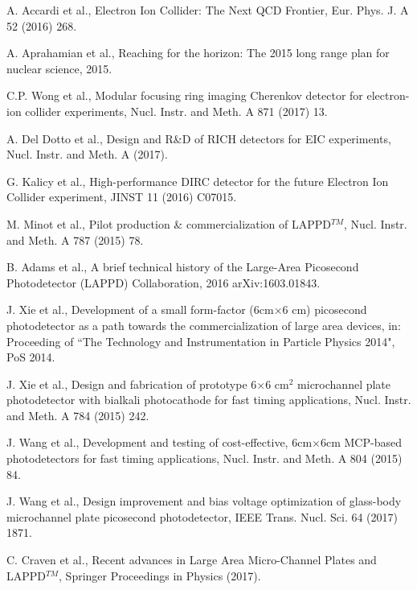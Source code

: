 \documentclass[preprint,5p]{elsarticle}
\begin{document}
  

\begin{thebibliography}{00}

A. Accardi et al., Electron Ion Collider: The Next QCD Frontier, Eur. Phys. J.  
A 52 (2016) 268.

A. Aprahamian et al., Reaching for the horizon: The 2015 long range plan for 
nuclear science, 2015. 

C.P. Wong et al., Modular focusing ring imaging Cherenkov detector for 
electron-ion collider experiments, Nucl. Instr. and Meth. A 871 (2017) 13.

A. Del Dotto et al., Design and R{\&}D of RICH detectors for EIC experiments, 
   Nucl. Instr. and Meth. A (2017).

G. Kalicy et al., High-performance DIRC detector for the future Electron Ion 
Collider experiment, JINST 11 (2016) C07015.

   M. Minot et al., Pilot production {\&} commercialization of LAPPD$^{TM}$, 
   Nucl.  Instr.  and Meth. A 787 (2015) 78.

B. Adams et al., A brief technical history of the Large-Area Picosecond 
Photodetector (LAPPD) Collaboration, 2016 arXiv:1603.01843.

J. Xie et al., Development of a small form-factor (6cm$\times$6 cm) picosecond 
photodetector as a path towards the commercialization of large area devices, 
in: Proceeding of ``The Technology and Instrumentation in Particle Physics 
2014", PoS 2014.

J. Xie et al., Design and fabrication of prototype 6$\times$6 cm$^2$ 
microchannel plate photodetector with bialkali photocathode for fast timing 
applications, Nucl. Instr. and Meth. A 784 (2015) 242.

J. Wang et al., Development and testing of cost-effective, 6cm$\times$6cm 
MCP-based photodetectors for fast timing applications, Nucl. Instr. and Meth.  
A 804 (2015) 84.

J. Wang et al., Design improvement and bias voltage optimization of glass-body 
microchannel plate picosecond photodetector, IEEE Trans. Nucl. Sci. 64 (2017) 
1871.

C. Craven et al., Recent advances in Large Area Micro-Channel Plates and 
LAPPD$^{TM}$, Springer Proceedings in Physics (2017).


\end{thebibliography}
\end{document}
